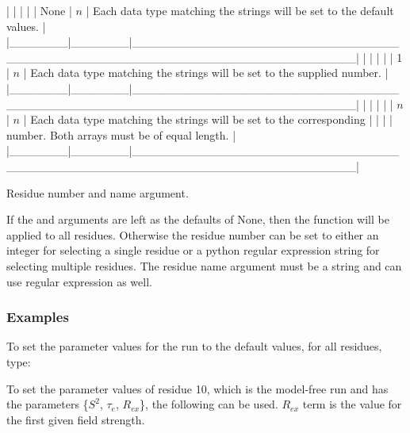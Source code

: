 |       |       |                                                                          |
| None  |   $n$   | Each data type matching the strings will be set to the default values.   |
|\_\_\_\_\_\_\_|\_\_\_\_\_\_\_|\_\_\_\_\_\_\_\_\_\_\_\_\_\_\_\_\_\_\_\_\_\_\_\_\_\_\_\_\_\_\_\_\_\_\_\_\_\_\_\_\_\_\_\_\_\_\_\_\_\_\_\_\_\_\_\_\_\_\_\_\_\_\_\_\_\_\_\_\_\_\_\_\_\_|
|       |       |                                                                          |
|   1   |   $n$   | Each data type matching the strings will be set to the supplied number.  |
|\_\_\_\_\_\_\_|\_\_\_\_\_\_\_|\_\_\_\_\_\_\_\_\_\_\_\_\_\_\_\_\_\_\_\_\_\_\_\_\_\_\_\_\_\_\_\_\_\_\_\_\_\_\_\_\_\_\_\_\_\_\_\_\_\_\_\_\_\_\_\_\_\_\_\_\_\_\_\_\_\_\_\_\_\_\_\_\_\_|
|       |       |                                                                          |
|   $n$   |   $n$   | Each data type matching the strings will be set to the corresponding     |
|       |       | number.  Both arrays must be of equal length.                            |
|\_\_\_\_\_\_\_|\_\_\_\_\_\_\_|\_\_\_\_\_\_\_\_\_\_\_\_\_\_\_\_\_\_\_\_\_\_\_\_\_\_\_\_\_\_\_\_\_\_\_\_\_\_\_\_\_\_\_\_\_\_\_\_\_\_\_\_\_\_\_\_\_\_\_\_\_\_\_\_\_\_\_\_\_\_\_\_\_\_|


Residue number and name argument.

If the 
 and 
 arguments are left as the defaults of None, then the
function will be applied to all residues.  Otherwise the residue number can be set to either
an integer for selecting a single residue or a python regular expression string for
selecting multiple residues.  The residue name argument must be a string and can use regular
expression as well.


\subsubsection{Examples}

To set the parameter values for the run 
 to the default values, for all residues,
type:




To set the parameter values of residue 10, which is the model-free run 
 and has the
parameters \{$S^2$, $\tau_e$, $R_{ex}$\}, the following can be used.  $R_{ex}$ term is the value for the first
given field strength.


